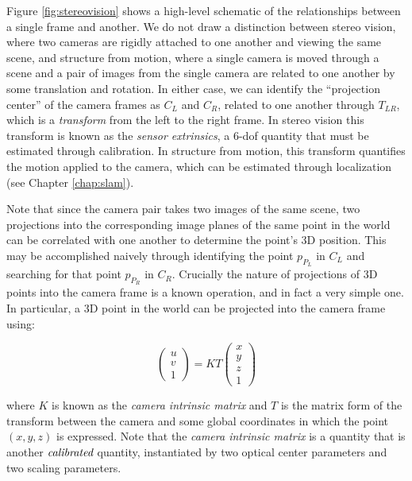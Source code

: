 Figure \ref{fig:stereovision} shows a high-level schematic of the relationships between a single frame and another. We do not draw a distinction between stereo vision, where two cameras are rigidly attached to one another and viewing the same scene, and structure from motion, where a single camera is moved through a scene and a pair of images from the single camera are related to one another by some translation and rotation. In either case, we can identify the ``projection center'' of the camera frames as $C_L$ and $C_R$, related to one another through $T_{LR}$, which is a \emph{transform} from the left to the right frame. In stereo vision this transform is known as the \emph{sensor extrinsics}, a 6-dof quantity that must be estimated through calibration. In structure from motion, this transform quantifies the motion applied to the camera, which can be estimated through localization (see Chapter \ref{chap:slam}).

Note that since the camera pair takes two images of the same scene, two projections into the corresponding image planes of the same point in the world can be correlated with one another to determine the point's 3D position. This may be accomplished naively through identifying the point $p_{P_L}$ in $C_L$ and searching for that point $p_{P_R}$ in $C_R$. Crucially the nature of projections of 3D points into the camera frame is a known operation, and in fact a very simple one. In particular, a 3D point in the world can be projected into the camera frame using:

\begin{equation}
\begin{pmatrix}
u\\
v\\
1
\end{pmatrix}
= K T \begin{pmatrix}
x\\
y\\
z\\
1 
\end{pmatrix}
\label{eq:stereovision}
\end{equation}

\noindent where $K$ is known as the \emph{camera intrinsic matrix} and $T$ is the matrix form of the transform between the camera and some global coordinates in which the point $(x, y, z)$ is expressed. Note that the \emph{camera intrinsic matrix} is a quantity that is another $\emph{calibrated}$ quantity, instantiated by two optical center parameters and two scaling parameters.

